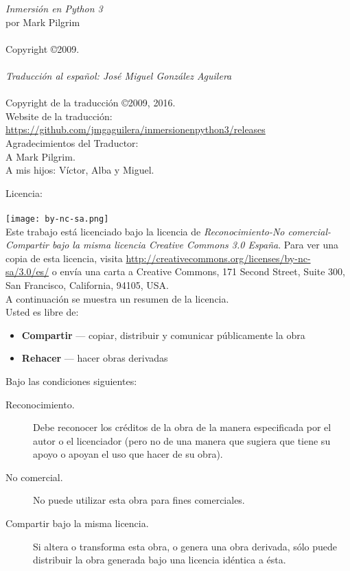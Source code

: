 \pagestyle{empty}
\frontmatter
\noindent
\textsf{\emph{Inmersión en Python 3}}\\
por Mark Pilgrim\\
\\
Copyright \copyright 2009.\\
\\
\textsf{\emph{Traducción al español: José Miguel González Aguilera}}\\
\\
Copyright de la traducción \copyright 2009, 2016.\\
Website de la traducción: \href{https://github.com/jmgaguilera/inmersionenpython3/releases}{https://github.com/jmgaguilera/inmersionenpython3/releases}\\
\linebreak 
\noindent
Agradecimientos del Traductor:\\
A Mark Pilgrim.\\
A mis hijos: Víctor, Alba y Miguel.

\noindent
Licencia:\\
\\
\texttt{[image: by-nc-sa.png]}\\
Este trabajo está licenciado bajo la licencia de \emph{Reconocimiento-No comercial-Compartir bajo la misma licencia Creative Commons 3.0 España}. Para ver una copia de esta licencia, visita \href{http://creativecommons.org/licenses/by-nc-sa/3.0/es/}{http://creativecommons.org/licenses/by-nc-sa/3.0/es/} o envía una carta a Creative Commons, 171 Second Street, Suite 300, San Francisco, California, 94105, USA.\\

\noindent
A continuación se muestra un resumen de la licencia.\\

\noindent
Usted es libre de:
\begin{itemize}
 \item \textbf{Compartir} — copiar, distribuir y comunicar públicamente la obra
 \item \textbf{Rehacer} — hacer obras derivadas
\end{itemize}
\noindent
Bajo las condiciones siguientes:
\begin{description}
 \item[Reconocimiento.] Debe reconocer los créditos de la obra de la manera especificada por el autor o el licenciador (pero no de una manera que sugiera que tiene su apoyo o apoyan el uso que hacer de su obra).
 \item[No comercial.] No puede utilizar esta obra para fines comerciales.
 \item[Compartir bajo la misma licencia.] Si altera o transforma esta obra, o genera una obra derivada, sólo puede distribuir la obra generada bajo una licencia idéntica a ésta. 
\end{description}

